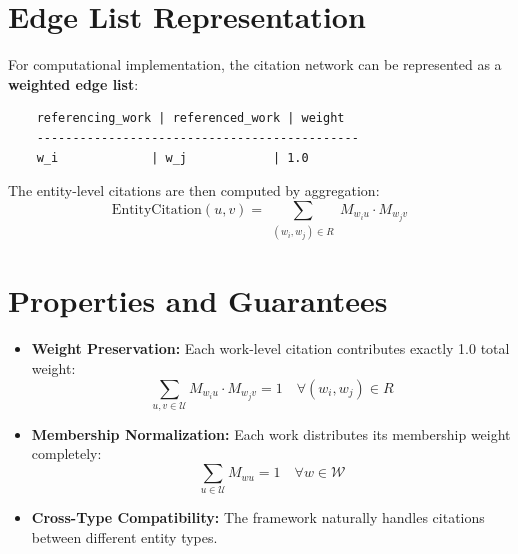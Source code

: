 \documentclass[12pt]{article}
\begin{document}
\section{Edge List Representation}

For computational implementation, the citation network can be represented as a \textbf{weighted edge list}:

\begin{verbatim}
	referencing_work | referenced_work | weight
	---------------------------------------------
	w_i             | w_j            | 1.0
\end{verbatim}

The entity-level citations are then computed by aggregation:
\[
\text{EntityCitation}(u, v) = \sum_{\substack{(w_i, w_j) \in R}} M_{w_i u} \cdot M_{w_j v}
\]

\section{Properties and Guarantees}

\begin{itemize}
	\item \textbf{Weight Preservation:} Each work-level citation contributes exactly 1.0 total weight:
	\[
	\sum_{u,v \in \mathcal{U}} M_{w_i u} \cdot M_{w_j v} = 1 \quad \forall (w_i, w_j) \in R
	\]
	\item \textbf{Membership Normalization:} Each work distributes its membership weight completely:
	\[
	\sum_{u \in \mathcal{U}} M_{wu} = 1 \quad \forall w \in \mathcal{W}
	\]
	\item \textbf{Cross-Type Compatibility:} The framework naturally handles citations between different entity types.
\end{itemize}




\end{document}
